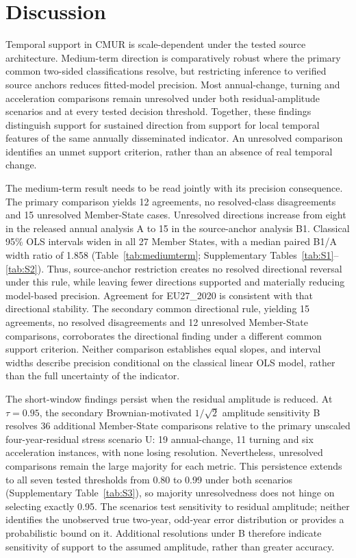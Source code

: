 \section{Discussion}

Temporal support in CMUR is scale-dependent under the tested source architecture. Medium-term direction is comparatively robust where the primary common two-sided classifications resolve, but restricting inference to verified source anchors reduces fitted-model precision. Most annual-change, turning and acceleration comparisons remain unresolved under both residual-amplitude scenarios and at every tested decision threshold. Together, these findings distinguish support for sustained direction from support for local temporal features of the same annually disseminated indicator. An unresolved comparison identifies an unmet support criterion, rather than an absence of real temporal change.

The medium-term result needs to be read jointly with its precision consequence. The primary comparison yields 12 agreements, no resolved-class disagreements and 15 unresolved Member-State cases. Unresolved directions increase from eight in the released annual analysis A to 15 in the source-anchor analysis B1. Classical 95\% OLS intervals widen in all 27 Member States, with a median paired B1/A width ratio of 1.858 (Table~\ref{tab:mediumterm}; Supplementary Tables~\ref{tab:S1}--\ref{tab:S2}). Thus, source-anchor restriction creates no resolved directional reversal under this rule, while leaving fewer directions supported and materially reducing model-based precision. Agreement for EU27\_2020 is consistent with that directional stability. The secondary common directional rule, yielding 15 agreements, no resolved disagreements and 12 unresolved Member-State comparisons, corroborates the directional finding under a different common support criterion. Neither comparison establishes equal slopes, and interval widths describe precision conditional on the classical linear OLS model, rather than the full uncertainty of the indicator.

The short-window findings persist when the residual amplitude is reduced. At $\tau=0.95$, the secondary Brownian-motivated $1/\sqrt{2}$ amplitude sensitivity B resolves 36 additional Member-State comparisons relative to the primary unscaled four-year-residual stress scenario U: 19 annual-change, 11 turning and six acceleration instances, with none losing resolution. Nevertheless, unresolved comparisons remain the large majority for each metric. This persistence extends to all seven tested thresholds from 0.80 to 0.99 under both scenarios (Supplementary Table~\ref{tab:S3}), so majority unresolvedness does not hinge on selecting exactly 0.95. The scenarios test sensitivity to residual amplitude; neither identifies the unobserved true two-year, odd-year error distribution or provides a probabilistic bound on it. Additional resolutions under B therefore indicate sensitivity of support to the assumed amplitude, rather than greater accuracy.

